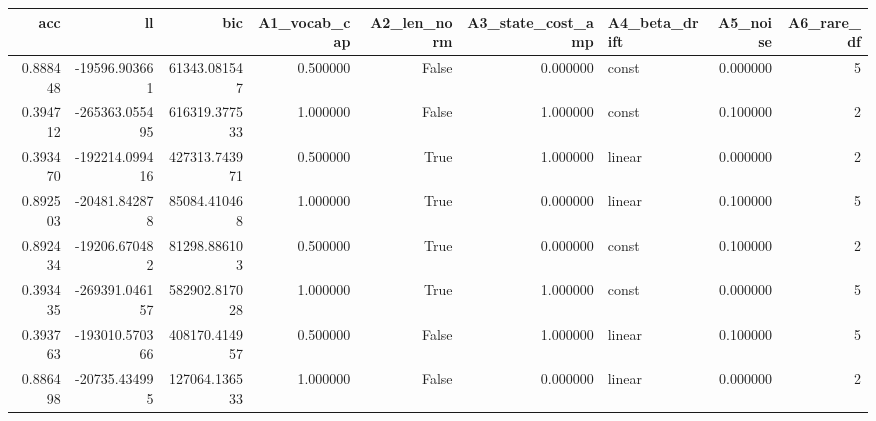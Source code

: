 \begin{tabular}{rrrrrrlrr}
\toprule
acc & ll & bic & A1\_vocab\_cap & A2\_len\_norm & A3\_state\_cost\_amp & A4\_beta\_drift & A5\_noise & A6\_rare\_df \\
\midrule
0.888448 & -19596.903661 & 61343.081547 & 0.500000 & False & 0.000000 & const & 0.000000 & 5 \\
0.394712 & -265363.055495 & 616319.377533 & 1.000000 & False & 1.000000 & const & 0.100000 & 2 \\
0.393470 & -192214.099416 & 427313.743971 & 0.500000 & True & 1.000000 & linear & 0.000000 & 2 \\
0.892503 & -20481.842878 & 85084.410468 & 1.000000 & True & 0.000000 & linear & 0.100000 & 5 \\
0.892434 & -19206.670482 & 81298.886103 & 0.500000 & True & 0.000000 & const & 0.100000 & 2 \\
0.393435 & -269391.046157 & 582902.817028 & 1.000000 & True & 1.000000 & const & 0.000000 & 5 \\
0.393763 & -193010.570366 & 408170.414957 & 0.500000 & False & 1.000000 & linear & 0.100000 & 5 \\
0.886498 & -20735.434995 & 127064.136533 & 1.000000 & False & 0.000000 & linear & 0.000000 & 2 \\
\bottomrule
\end{tabular}
